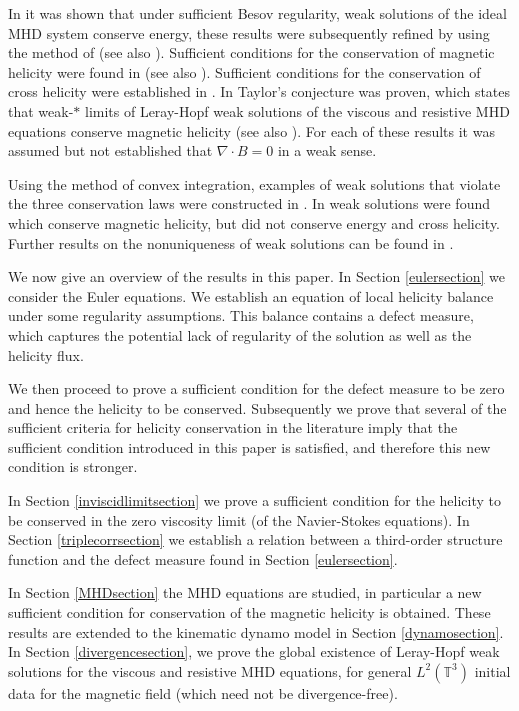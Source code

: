 \documentclass[12pt,a4paper]{article}
\theoremstyle{definition}
\theoremstyle{remark}
\numberwithin{equation}{section}
\begin{document}
In \cite{caflisch} it was shown that under sufficient Besov regularity, weak solutions of the ideal MHD system conserve energy, these results were subsequently refined by \cite{kang} using the method of \cite{cheskidovconstantin} (see also \cite{yu}).  Sufficient conditions for the conservation of magnetic helicity were found in \cite{caflisch,kang} (see also \cite{aluie,faracobounded}). Sufficient conditions for the conservation of cross helicity were established in \cite{kang,yu}. In \cite{faracotaylor} Taylor's conjecture was proven, which states that weak-$*$ limits of Leray-Hopf weak solutions of the viscous and resistive MHD equations conserve magnetic helicity (see also \cite{faracobounded}). For each of these results it was assumed but not established that $\nabla \cdot B = 0$ in a weak sense.

Using the method of convex integration, examples of weak solutions that violate the three conservation laws were constructed in \cite{beekie}. In \cite{faracobounded} weak solutions were found which conserve magnetic helicity, but did not conserve energy and cross helicity. Further results on the nonuniqueness of weak solutions can be found in \cite{limhd,linonuniqueness}.

We now give an overview of the results in this paper. In Section \ref{eulersection} we consider the Euler equations. We establish an equation of local helicity balance under some regularity assumptions. This balance contains a defect measure, which captures the potential lack of regularity of the solution as well as the helicity flux. 

We then proceed to prove a sufficient condition for the defect measure to be zero and hence the helicity to be conserved. Subsequently we prove that several of the sufficient criteria for helicity conservation in the literature imply that the sufficient condition introduced in this paper is satisfied, and therefore this new condition is stronger.

In Section \ref{inviscidlimitsection} we prove a sufficient condition for the helicity to be conserved in the zero viscosity limit (of the Navier-Stokes equations). In Section \ref{triplecorrsection} we establish a relation between a third-order structure function and the defect measure found in Section \ref{eulersection}. 

In Section \ref{MHDsection} the MHD equations are studied, in particular a new sufficient condition for conservation of the magnetic helicity is obtained. These results are extended to the kinematic dynamo model in Section \ref{dynamosection}. In Section \ref{divergencesection}, we prove the global existence of Leray-Hopf weak solutions for the viscous and resistive MHD equations, for general $L^2 (\mathbb{T}^3)$ initial data for the magnetic field (which need not be divergence-free). 
\end{document}

